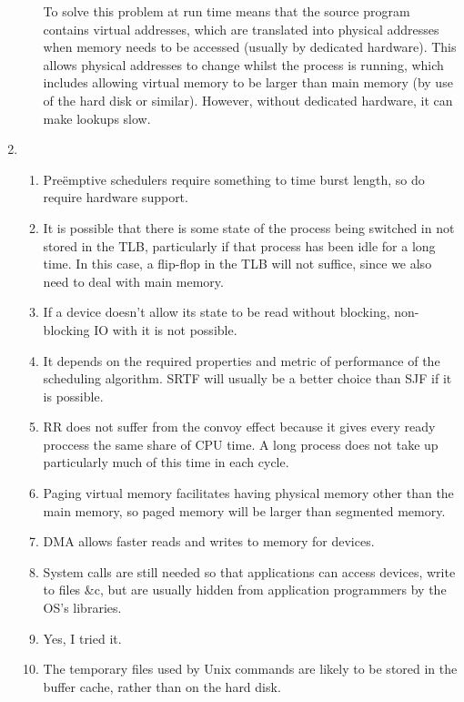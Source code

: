 \documentclass[11pt]{article}
\begin{document}
\begin{enumerate}
\begin{enumerate}
    To solve this problem at run time means that the source program contains virtual addresses, which are translated into physical addresses when memory needs to be accessed (usually by dedicated hardware). This allows physical addresses to change whilst the process is running, which includes allowing virtual memory to be larger than main memory (by use of the hard disk or similar). However, without dedicated hardware, it can make lookups slow.
  \end{enumerate}
\item
  \begin{enumerate}
  \item Preëmptive schedulers require something to time burst length, so do require hardware support.
  \item It is possible that there is some state of the process being switched in not stored in the TLB, particularly if that process has been idle for a long time. In this case, a flip-flop in the TLB will not suffice, since we also need to deal with main memory.
  \item If a device doesn't allow its state to be read without blocking, non-blocking IO with it is not possible.
  \item It depends on the required properties and metric of performance of the scheduling algorithm. SRTF will usually be a better choice than SJF if it is possible.
  \item RR does not suffer from the convoy effect because it gives every ready proccess the same share of CPU time. A long process does not take up particularly much of this time in each cycle.
  \item Paging virtual memory facilitates having physical memory other than the main memory, so paged memory will be larger than segmented memory.
  \item DMA allows faster reads and writes to memory for devices.
  \item System calls are still needed so that applications can access devices, write to files \&c, but are usually hidden from application programmers by the OS's libraries.
  \item Yes, I tried it.
  \item The temporary files used by Unix commands are likely to be stored in the buffer cache, rather than on the hard disk.
  \end{enumerate}
\end{enumerate}
\end{document}
